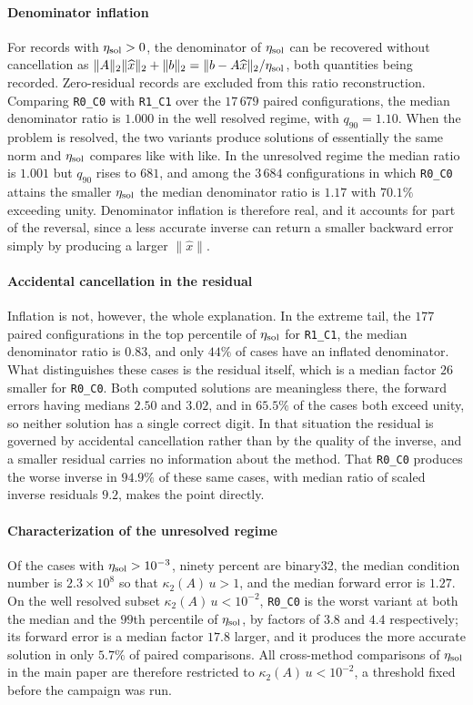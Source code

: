 \documentclass[supplement,review,onefignum,onetabnum]{siamart251216}
\begin{document}
\paragraph{Denominator inflation}
For records with $\eta_{\rm sol}>0$, the denominator of $\eta_{\rm sol}$ can be recovered without
cancellation as $\|A\|_2\|\widehat x\|_2+\|b\|_2 =
\|b-A\widehat x\|_2/\eta_{\rm sol}$, both quantities being recorded.  Zero-residual records
are excluded from this ratio reconstruction. Comparing \texttt{R0\_C0} with \texttt{R1\_C1} over
the $17\,679$ paired configurations, the median denominator ratio is $1.000$
in the well resolved regime, with $q_{90}=1.10$. When the problem is resolved,
the two variants produce solutions of essentially the same norm and
$\eta_{\rm sol}$ compares like with like. In the unresolved regime the median
ratio is $1.001$ but $q_{90}$ rises to $681$, and among the $3\,684$
configurations in which \texttt{R0\_C0} attains the smaller $\eta_{\rm sol}$
the median denominator ratio is $1.17$ with $70.1\%$ exceeding unity.
Denominator inflation is therefore real, and it accounts for part of the
reversal, since a less accurate inverse can return a smaller backward error simply by
producing a larger $\|\widehat x\|$.

\paragraph{Accidental cancellation in the residual}
Inflation is not, however, the whole explanation. In the extreme tail, the
$177$ paired configurations in the top percentile of $\eta_{\rm sol}$ for
\texttt{R1\_C1}, the median denominator ratio is $0.83$, and only $44\%$ of
cases have an inflated denominator. What distinguishes these cases is the
residual itself, which is a median factor $26$ smaller for \texttt{R0\_C0}.
Both computed solutions are meaningless there, the forward errors having medians
$2.50$ and $3.02$, and in $65.5\%$ of the cases both exceed unity, so neither
solution has a single correct digit. In that situation the residual is governed
by accidental cancellation rather than by the quality of the inverse, and a
smaller residual carries no information about the method. That \texttt{R0\_C0}
produces the worse inverse in $94.9\%$ of these same cases, with median ratio of
scaled inverse residuals $9.2$, makes the point directly.

\paragraph{Characterization of the unresolved regime}
Of the cases with $\eta_{\rm sol}>10^{-3}$, ninety percent are binary32, the
median condition number is $2.3\times10^{8}$ so that $\kappa_2(A)\,u>1$, and
the median forward error is $1.27$. On the well resolved subset
$\kappa_2(A)\,u<10^{-2}$, \texttt{R0\_C0} is the worst variant at both the
median and the $99$th percentile of $\eta_{\rm sol}$, by factors of $3.8$ and
$4.4$ respectively; its forward error is a median factor $17.8$ larger, and it
produces the more accurate solution in only $5.7\%$ of paired comparisons.
All cross-method comparisons of $\eta_{\rm sol}$ in the main paper are
therefore restricted to $\kappa_2(A)\,u<10^{-2}$, a threshold fixed before the
campaign was run.
\end{document}
